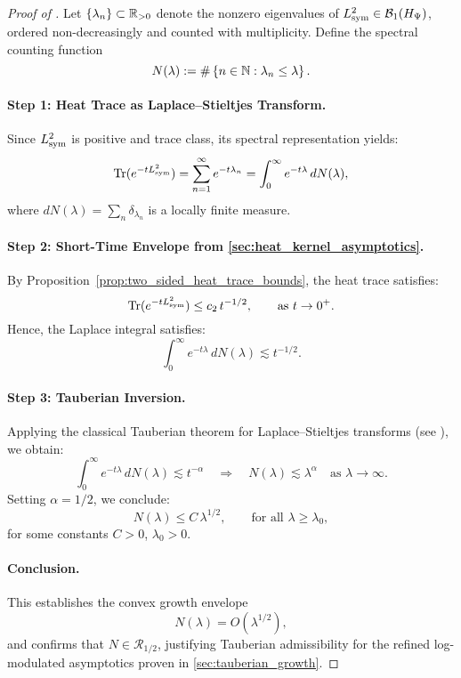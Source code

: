 \begin{proof}[Proof of ]
Let \( \{ \lambda_n \} \subset \mathbb{R}_{>0} \) denote the nonzero eigenvalues of \( L_{\mathrm{sym}}^2 \in \mathcal{B}_1(H_{\Psi}) \), ordered non-decreasingly and counted with multiplicity. Define the spectral counting function
\[
N(\lambda) := \#\left\{ n \in \mathbb{N} : \lambda_n \le \lambda \right\}.
\]

\paragraph{Step 1: Heat Trace as Laplace–Stieltjes Transform.}
Since \( L_{\mathrm{sym}}^2 \) is positive and trace class, its spectral representation yields:
\[
\operatorname{Tr}(e^{-t L_{\mathrm{sym}}^2}) = \sum_{n=1}^\infty e^{-t \lambda_n}
= \int_0^\infty e^{-t\lambda} \, dN(\lambda),
\]
where \( dN(\lambda) = \sum_n \delta_{\lambda_n} \) is a locally finite measure.

\paragraph{Step 2: Short-Time Envelope from \cref{sec:heat_kernel_asymptotics}.}
By Proposition~\ref{prop:two_sided_heat_trace_bounds}, the heat trace satisfies:
\[
\operatorname{Tr}(e^{-t L_{\mathrm{sym}}^2}) \leq c_2 \, t^{-1/2}, \qquad \text{as } t \to 0^+.
\]
Hence, the Laplace integral satisfies:
\[
\int_0^\infty e^{-t\lambda} \, dN(\lambda) \lesssim t^{-1/2}.
\]

\paragraph{Step 3: Tauberian Inversion.}
Applying the classical Tauberian theorem for Laplace–Stieltjes transforms (see ), we obtain:
\[
\int_0^\infty e^{-t\lambda} \, dN(\lambda) \lesssim t^{-\alpha}
\quad \Longrightarrow \quad
N(\lambda) \lesssim \lambda^{\alpha} \quad \text{as } \lambda \to \infty.
\]
Setting \( \alpha = 1/2 \), we conclude:
\[
N(\lambda) \leq C\, \lambda^{1/2}, \qquad \text{for all } \lambda \ge \lambda_0,
\]
for some constants \( C > 0 \), \( \lambda_0 > 0 \).

\paragraph{Conclusion.}
This establishes the convex growth envelope
\[
N(\lambda) = O(\lambda^{1/2}),
\]
and confirms that \( N \in \mathcal{R}_{1/2} \), justifying Tauberian admissibility for the refined log-modulated asymptotics proven in \cref{sec:tauberian_growth}.
\end{proof}
